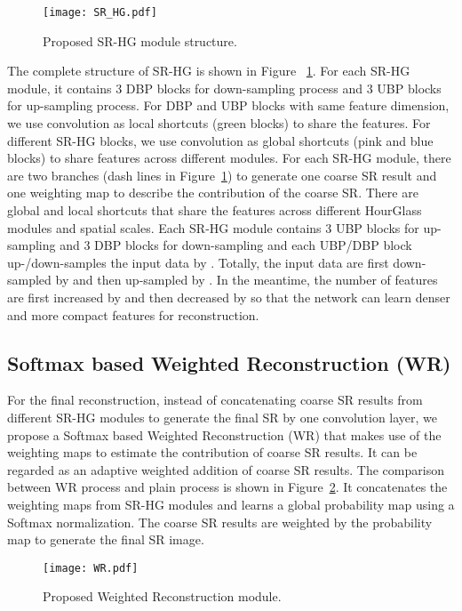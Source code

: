 \documentclass[10pt,twocolumn,letterpaper]{article}
\begin{document}
\begin{figure}[htb]
\vskip 0.01in
\begin{center}
\centerline{\texttt{[image: SR\_HG.pdf]}}
\caption{Proposed SR-HG module structure.}
\label{Figure 4}
\end{center}
\vskip -0.3in
\end{figure}

The complete structure of SR-HG is shown in Figure ~\ref{Figure 4}. For each SR-HG module, it contains 3 DBP blocks for down-sampling process and 3 UBP blocks for up-sampling process. For DBP and UBP blocks with same feature dimension, we use  convolution as local shortcuts (green blocks) to share the features. For different SR-HG blocks, we use  convolution as global shortcuts (pink and blue blocks) to share features across different modules. For each SR-HG module, there are two branches (dash lines in Figure~\ref{Figure 4}) to generate one coarse SR result and one weighting map to describe the contribution of the coarse SR. There are global and local shortcuts that share the features across different HourGlass modules and spatial scales. Each SR-HG module contains 3 UBP blocks for up-sampling and 3 DBP blocks for down-sampling and each UBP/DBP block up-/down-samples the input data by . Totally, the input data are first down-sampled by  and then up-sampled by . In the meantime, the number of features are first increased by  and then decreased by  so that the network can learn denser and more compact features for reconstruction.

\subsection{Softmax based Weighted Reconstruction (WR)}
For the final reconstruction, instead of concatenating coarse SR results from different SR-HG modules to generate the final SR by one convolution layer, we propose a Softmax based Weighted Reconstruction (WR) that makes use of the weighting maps to estimate the contribution of coarse SR results. It can be regarded as an adaptive weighted addition of coarse SR results. The comparison between WR process and plain process is shown in Figure~\ref{Figure 5}. It concatenates the weighting maps from SR-HG modules and learns a global probability map using a Softmax normalization. The coarse SR results are weighted by the probability map to generate the final SR image.

\begin{figure}[htb]
\vskip 0.01in
\begin{center}
\centerline{\texttt{[image: WR.pdf]}}
\caption{Proposed Weighted Reconstruction module.}
\label{Figure 5}
\end{center}
\vskip -0.3in
\end{figure}
\end{document}
